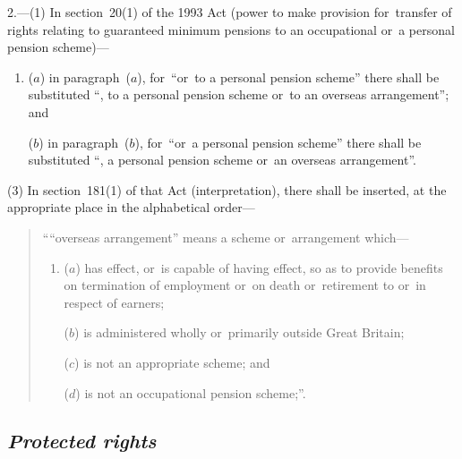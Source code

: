 \documentclass[12pt,a4paper]{article}
\begin{document}
2.---(1) In section~20(1)  of the 1993 Act (power to make provision for~transfer of rights relating to guaranteed minimum pensions to an occupational or~a personal pension scheme)—
\begin{enumerate}\item[]
($a$) in paragraph~($a$), for~“or~to a personal pension scheme” there shall be substituted “, to a personal pension scheme or~to an overseas arrangement”; and

($b$) in paragraph~($b$), for~“or~a personal pension scheme” there shall be substituted “, a personal pension scheme or~an overseas arrangement”.
\end{enumerate}

%

(3) In section~181(1)  of that Act (interpretation), there shall be inserted, at the appropriate place in the alphabetical order—
\begin{quotation}
““overseas arrangement” means a scheme or~arrangement which—
\begin{enumerate}\item[]
($a$) has effect, or~is capable of having effect, so as to provide benefits on termination of employment or~on death or~retirement to or~in respect of earners;

($b$) is administered wholly or~primarily outside Great Britain;

($c$) is not an appropriate scheme; and

($d$) is not an occupational pension scheme;”.
\end{enumerate}
\end{quotation}


\subsection*{\itshape Protected rights}
\end{document}
